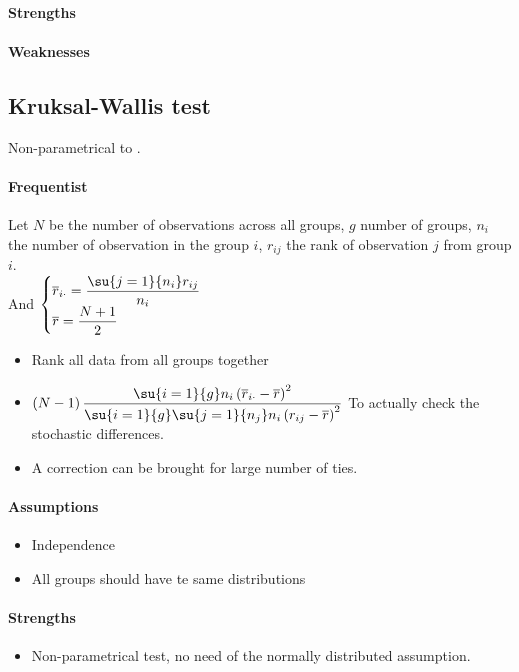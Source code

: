 \paragraph{Strengths}
\paragraph{Weaknesses}

\subsection{Kruksal-Wallis test}
Non-parametrical to .
\paragraph{Frequentist}
Let $N$ be the number of observations across all groups, $g$ number of groups, $n_{i}$ the
number of observation in the group $i$, $r_{ij}$ the rank of observation $j$ from group
$i$.\\
And 
$\begin{cases}
    \overline{r}_{i\cdot} = \dfrac{\su{j=1}{n_{i}}r_{ij}}{n_{i}} \\
    \overline{r} = \dfrac{N + 1}{2}
\end{cases}$
\begin{itemize}
    \item Rank all data from all groups together
    \item $\left(N-1\right)\dfrac{\su{i=1}{g}n_{i}\left(\overline{r}_{i\cdot} - 
                \overline{r}\right)^{2}}{\su{i=1}{g}\su{j=1}{n_{j}}n_{i}\left(r_{ij} - 
        \overline{r}\right)^{2}}$
        To actually check the stochastic differences.
    \item A correction can be brought for large number of ties.

\end{itemize}

\paragraph{Assumptions}
\begin{itemize}
    \item Independence
    \item All groups should have te same distributions
\end{itemize}

\paragraph{Strengths}
\begin{itemize}
    \item Non-parametrical test, no need of the normally distributed assumption.
\end{itemize}

